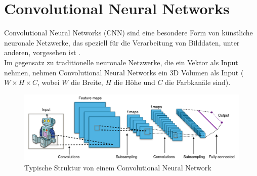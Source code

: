 
\section{Convolutional Neural Networks}
Convolutional Neural Networks (\gls{CNN}) sind eine besondere Form von künstliche neuronale Netzwerke, das speziell für 
die Verarbeitung von Bilddaten, unter anderen, vorgesehen ist \cite{convnet-erklaerung}.
\\
Im gegensatz zu traditionelle neuronale Netzwerke, die ein Vektor als Input nehmen, nehmen Convolutional Neural Networks ein 3D Volumen als Input
($ W \times H \times C $, wobei $W$ die Breite, $H$ die Höhe und $C$ die Farbkanäle sind).

\begin{figure}[H]
  \centering
  \includegraphics[width=1\textwidth]{resources/cnn/typical_cnn.png}
  \caption{
    Typische Struktur von einem Convolutional Neural Network
    \cite{typical_cnn_img}
  }
  \label{image:typical_cnn_img}
\end{figure}


